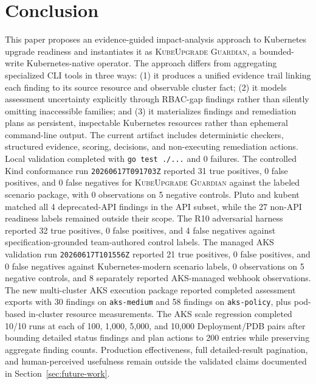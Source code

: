 \documentclass[10pt,journal]{IEEEtran}
\newcommand{\tool}{\textsc{KubeUpgrade Guardian}}
\newcommand{\code}[1]{\texttt{#1}}
\begin{document}
\section{Conclusion}
This paper proposes an evidence-guided impact-analysis approach to Kubernetes upgrade readiness and instantiates it as \tool, a bounded-write Kubernetes-native operator. The approach differs from aggregating specialized CLI tools in three ways: (1) it produces a unified evidence trail linking each finding to its source resource and observable cluster fact; (2) it models assessment uncertainty explicitly through RBAC-gap findings rather than silently omitting inaccessible families; and (3) it materializes findings and remediation plans as persistent, inspectable Kubernetes resources rather than ephemeral command-line output. The current artifact includes deterministic checkers, structured evidence, scoring, decisions, and non-executing remediation actions. Local validation completed with \code{go test ./...} and 0 failures. The controlled Kind conformance run \code{20260617T091703Z} reported 31 true positives, 0 false positives, and 0 false negatives for \tool{} against the labeled scenario package, with 0 observations on 5 negative controls. Pluto and kubent matched all 4 deprecated-API findings in the API subset, while the 27 non-API readiness labels remained outside their scope. The R10 adversarial harness reported 32 true positives, 0 false positives, and 4 false negatives against specification-grounded team-authored control labels. The managed AKS validation run \code{20260617T101556Z} reported 21 true positives, 0 false positives, and 0 false negatives against Kubernetes-modern scenario labels, 0 observations on 5 negative controls, and 8 separately reported AKS-managed webhook observations. The new multi-cluster AKS execution package reported completed assessment exports with 30 findings on \code{aks-medium} and 58 findings on \code{aks-policy}, plus pod-based in-cluster resource measurements. The AKS scale regression completed 10/10 runs at each of 100, 1,000, 5,000, and 10,000 Deployment/PDB pairs after bounding detailed status findings and plan actions to 200 entries while preserving aggregate finding counts. Production effectiveness, full detailed-result pagination, and human-perceived usefulness remain outside the validated claims documented in Section~\ref{sec:future-work}.
\end{document}
